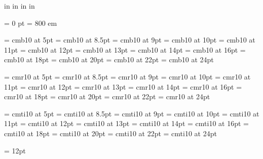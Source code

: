 
 in     %
 in    %
 in  %
 in  %

\nopagenumbers

\parindent = 0 pt
\emergencystretch = 800 em

\font\FFba=      cmb10           at 5pt
\font\FFbb=      cmb10           at 8.5pt
\font\FFbc=      cmb10           at  9pt
\font\FFbd=      cmb10           at 10pt
\font\FFbe=      cmb10           at 11pt
\font\FFbf=      cmb10           at 12pt
\font\FFbg=      cmb10           at 13pt
\font\FFbh=      cmb10           at 14pt
\font\FFbi=      cmb10           at 16pt
\font\FFbj=      cmb10           at 18pt
\font\FFbk=      cmb10           at 20pt
\font\FFbl=      cmb10           at 22pt
\font\FFbm=      cmb10           at 24pt

\font\FFra=      cmr10           at 5pt
\font\FFrb=      cmr10           at 8.5pt
\font\FFrc=      cmr10           at  9pt
\font\FFrd=      cmr10           at 10pt
\font\FFre=      cmr10           at 11pt
\font\FFrf=      cmr10           at 12pt
\font\FFrg=      cmr10           at 13pt
\font\FFrh=      cmr10           at 14pt
\font\FFri=      cmr10           at 16pt
\font\FFrj=      cmr10           at 18pt
\font\FFrk=      cmr10           at 20pt
\font\FFrl=      cmr10           at 22pt
\font\FFrm=      cmr10           at 24pt

\font\FFta=      cmti10           at 5pt
\font\FFtb=      cmti10           at 8.5pt
\font\FFtc=      cmti10           at  9pt
\font\FFtd=      cmti10           at 10pt
\font\FFte=      cmti10           at 11pt
\font\FFtf=      cmti10           at 12pt
\font\FFtg=      cmti10           at 13pt
\font\FFth=      cmti10           at 14pt
\font\FFti=      cmti10           at 16pt
\font\FFtj=      cmti10           at 18pt
\font\FFtk=      cmti10           at 20pt
\font\FFtl=      cmti10           at 22pt
\font\FFtm=      cmti10           at 24pt



  \FFre \baselineskip = 12pt

